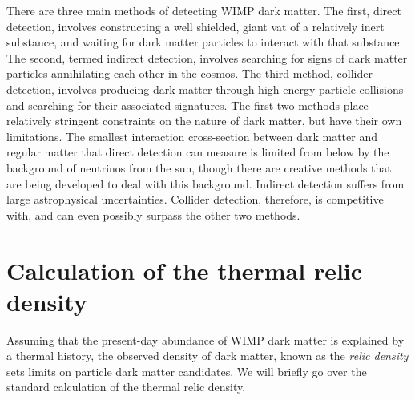There are three main methods of detecting WIMP dark matter. The first, direct detection, involves constructing a well shielded, giant vat of a relatively inert substance, and waiting for dark matter particles to interact with that substance. The second, termed indirect detection, involves searching for signs of dark matter particles annihilating each other in the cosmos. The third method, collider detection, involves producing dark matter through high energy particle collisions and searching for their associated signatures. The first two methods place relatively stringent constraints on the nature of dark matter, but have their own limitations. The smallest interaction cross-section between dark matter and regular matter that direct detection can measure is limited from below by the background of neutrinos from the sun, though there are creative methods that are being developed to deal with this background. Indirect detection suffers from large astrophysical uncertainties. Collider detection, therefore, is competitive with, and can even possibly surpass the other two methods.

\section{Calculation of the thermal relic density}

Assuming that the present-day abundance of WIMP dark matter is explained by a thermal history, the observed density of dark matter, known as the \emph{relic density} sets limits on particle dark matter candidates. We will briefly go over the standard calculation of the thermal relic density.

\newcommand{\fxv}{f(\mathbf{x},\mathbf{v})}

